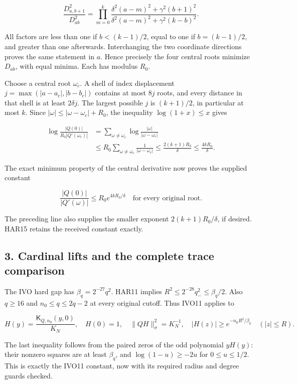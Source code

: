 \documentclass[11pt]{article}
\begin{document}
\[
\frac{D_{a,b+1}^2}{D_{ab}^2}
=\prod_{m=0}^k
\frac{\delta^2(a-m)^2+\gamma^2(b+1)^2}
{\delta^2(a-m)^2+\gamma^2(k-b)^2}.
\tag{HAR13}
\]

All factors are less than one if \(b<(k-1)/2\), equal to one if \(b=(k-1)/2\), and greater than one afterwards. Interchanging the two coordinate directions proves the same statement in \(a\). Hence precisely the four central roots minimize \(D_{ab}\), with equal minima. Each has modulus \(R_0\).

Choose a central root \(\omega_c\). A shell of index displacement \(j=\max(|a-a_c|,|b-b_c|)\) contains at most \(8j\) roots, and every distance in that shell is at least \(2\delta j\). The largest possible \(j\) is \((k+1)/2\), in particular at most \(k\). Since \(|\omega|\le|\omega-\omega_c|+R_0\), the inequality \(\log(1+x)\le x\) gives

\[
\begin{aligned}
\log\frac{|Q(0)|}{R_0|Q'(\omega_c)|}
&=\sum_{\omega\ne\omega_c}\log\frac{|\omega|}{|\omega-\omega_c|}\\
&\le R_0\sum_{\omega\ne\omega_c}\frac1{|\omega-\omega_c|}
\le\frac{2(k+1)R_0}{\delta}
\le\frac{4kR_0}{\delta}.
\end{aligned}
\tag{HAR14}
\]

The exact minimum property of the central derivative now proves the supplied constant

\[
\boxed{\frac{|Q(0)|}{|Q'(\omega)|}
\le R_0e^{4kR_0/\delta}\quad\text{for every original root}.}
\tag{HAR15}
\]

The preceding line also supplies the smaller exponent \(2(k+1)R_0/\delta\), if desired. HAR15 retains the received constant exactly.

\subsection{3. Cardinal lifts and the complete trace comparison}\label{cardinal-lifts-and-the-complete-trace-comparison}

The IVO hard gap has \(\beta_q=2^{-27}q^2\). HAR11 implies \(R^2\le2^{-28}q_-^2\le\beta_q/2\). Also \(q\ge16\) and \(n_0\le q\le2q-2\) at every original cutoff. Thus IVO11 applies to

\[
H(y)=\frac{\mathsf K_{Q,n_0}(y,0)}{K_N},
\quad H(0)=1,
\quad\|QH\|_\sigma^2=K_N^{-1},
\quad |H(z)|\ge e^{-n_0R^2/\beta_q}\quad(|z|\le R).
\tag{HAR16}
\]

The last inequality follows from the paired zeros of the odd polynomial \(yH(y)\): their nonzero squares are at least \(\beta_q\), and \(\log(1-u)\ge-2u\) for \(0\le u\le1/2\). This is exactly the IVO11 constant, now with its required radius and degree guards checked.
\end{document}
